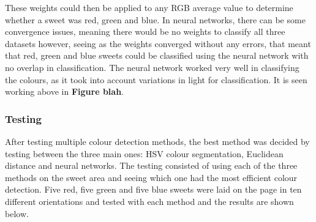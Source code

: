 These weights could then be applied to any RGB average value to determine whether a sweet was red, green and blue. In neural networks, there can be some convergence issues, meaning there would be no weights to classify all three datasets however, seeing as the weights converged without any errors, that meant that red, green and blue sweets could be classified using the neural network with no overlap in classification. The neural network worked very well in classifying the colours, as it took into account variations in light for classification. It is seen working above in \textbf{Figure blah}.
%
\subsubsection{Testing}
After testing multiple colour detection methods, the best method was decided by testing between the three main ones: HSV colour segmentation, Euclidean distance and neural networks. The testing consisted of using each of the three methods on the sweet area and seeing which one had the most efficient colour detection. Five red, five green and five blue sweets were laid on the page in ten different orientations and tested with each method and the results are shown below.
